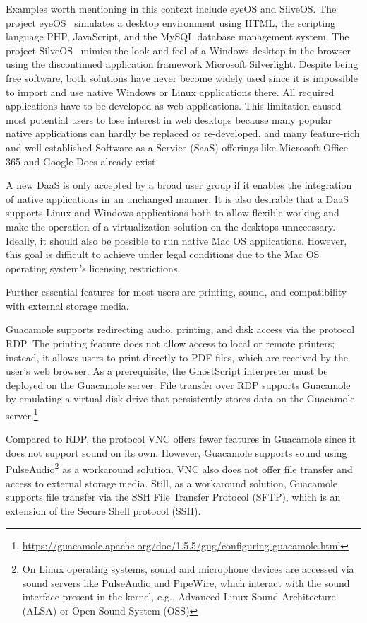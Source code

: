 \documentclass[runningheads]{llncs}
\begin{document}
Examples worth mentioning in this context include eyeOS and SilveOS.
The project eyeOS~\cite{liu2012research,vidyabanu2011implementation}
simulates a desktop environment using HTML,
the scripting language PHP, JavaScript,
and the MySQL database management system.
The project SilveOS~\cite{garmpis2016design}
mimics the look and feel of a Windows desktop in the browser
using the discontinued application framework Microsoft Silverlight.
Despite being free software,
both solutions have never become widely
used since it is impossible to import
and use native Windows or Linux applications there.
All required applications have to be developed as web applications.
This limitation caused most potential users to lose interest in web desktops
because many popular native applications can hardly be replaced or re-developed,
and many feature-rich and well-established Software-as-a-Service (SaaS)
offerings like Microsoft Office 365 and Google Docs already exist.

A new DaaS is only accepted by a broad user group if it
enables the integration of native applications in an unchanged manner.
It is also desirable that a DaaS supports Linux and Windows applications
both to allow flexible working and make the operation
of a virtualization solution on the desktops unnecessary.
Ideally, it should also be possible to run native Mac OS applications.
However, this goal is difficult to achieve under legal conditions
due to the Mac OS operating system's licensing restrictions.

Further essential features for most users are printing, sound,
and compatibility with external storage media.

Guacamole supports redirecting audio, printing,
and disk access via the protocol RDP.
The printing feature does not allow access to local or remote printers;
instead, it allows users to print directly to PDF files,
which are received by the user's web browser.
As a prerequisite, the GhostScript interpreter
must be deployed on the Guacamole server.
File transfer over RDP supports Guacamole
by emulating a virtual disk drive that persistently stores data
on the Guacamole server.\footnote{\url{https://guacamole.apache.org/doc/1.5.5/gug/configuring-guacamole.html}}

Compared to RDP, the protocol VNC offers fewer features in Guacamole
since it does not support sound on its own.
However, Guacamole supports sound using
PulseAudio\footnote{On Linux operating systems,
	sound and microphone devices are accessed via sound servers like PulseAudio and PipeWire,
	which interact with the sound interface present in the kernel,
	e.g., Advanced Linux Sound Architecture (ALSA) or Open Sound System (OSS)}
as a workaround solution.
VNC also does not offer file transfer and access to external storage media.
Still, as a workaround solution, Guacamole supports file transfer
via the SSH File Transfer Protocol (SFTP),
which is an extension of the Secure Shell protocol (SSH).
\end{document}

